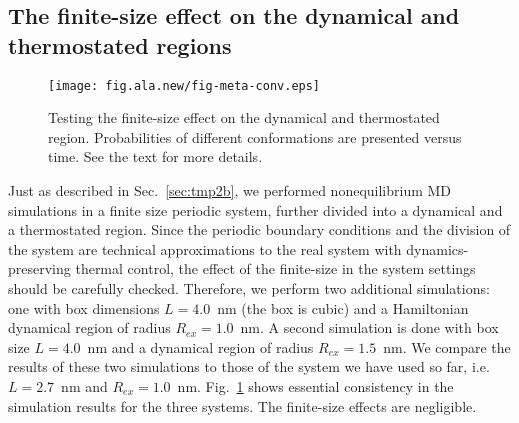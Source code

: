 \documentclass[a4paper,preprint,unsortedaddress,onecolumn]{revtex4-1}
\begin{document}
\subsection{The finite-size effect on the dynamical and thermostated regions}

\begin{figure}
  \centering
  \texttt{[image: fig.ala.new/fig-meta-conv.eps]}
  \caption{Testing the finite-size effect on the dynamical and thermostated region.
    Probabilities of different conformations are presented versus time.
    See the text for more details.
  }
  \label{fig:tmp7}
\end{figure}

Just as described in Sec.~\ref{sec:tmp2b}, we performed nonequilibrium MD
simulations in a finite size periodic system, further divided 
into a dynamical and a thermostated region.
Since the periodic boundary conditions and the division of the system
are technical approximations to the real system with dynamics-preserving thermal control, 
the effect of the finite-size in 
the system settings should be carefully checked.
Therefore, we
perform two additional simulations: one with box dimensions
$L=4.0$~nm (the box is cubic) and a
Hamiltonian dynamical region of radius $R_{ex} = 1.0$~nm. A second simulation is done with box size $L=4.0$~nm and a dynamical region of
radius $R_{ex} = 1.5$~nm. We compare the results of these two simulations to those of the system we have used so far, i.e. $L=2.7$~nm and $R_{ex} = 1.0$~nm.
Fig.~\ref{fig:tmp7} shows essential consistency in
the simulation results for the three systems. The finite-size effects are
negligible.
\end{document}
